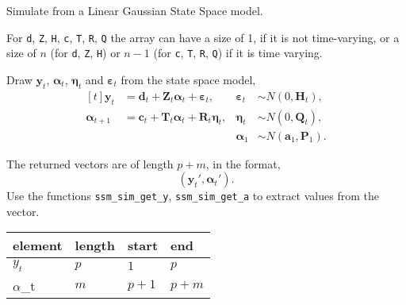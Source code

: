 \documentclass[]{book}
\newcommand{\mat}[1]{\boldsymbol{#1}}
\renewcommand{\vec}[1]{\boldsymbol{#1}}
\begin{document}
Simulate from a Linear Gaussian State Space model.

For \texttt{d}, \texttt{Z}, \texttt{H}, \texttt{c}, \texttt{T},
\texttt{R}, \texttt{Q} the array can have a size of 1, if it is not
time-varying, or a size of \(n\) (for \texttt{d}, \texttt{Z},
\texttt{H}) or \(n - 1\) (for \texttt{c}, \texttt{T}, \texttt{R},
\texttt{Q}) if it is time varying.

Draw \(\vec{y}_t\), \(\vec{\alpha}_t\), \(\vec{\eta}_t\) and
\(\vec{\varepsilon}_t\) from the state space model, \[
\begin{aligned}[t]
\vec{y}_t &= \vec{d}_t + \mat{Z}_t \vec{\alpha}_t + \vec{\varepsilon}_t,  &
\vec{\varepsilon}_t & \sim N(0, \mat{H}_t), \\
\vec{\alpha}_{t + 1} &= \vec{c}_t + \mat{T}_t \vec{\alpha}_t + \mat{R}_t \vec{\eta}_t,  &
\vec{\eta}_t & \sim N(0, \mat{Q}_t), \\
&& \vec{\alpha}_1 &\sim N(\vec{a}_1, \mat{P}_1) .
\end{aligned}
\]

The returned vectors are of length \(p + m\), in the format, \[
(\vec{y}_t', \vec{\alpha}_t') .
\] Use the functions \texttt{ssm\_sim\_get\_y},
\texttt{ssm\_sim\_get\_a} to extract values from the vector.

\begin{longtable}[]{@{}llll@{}}
\toprule
element & length & start & end\tabularnewline
\midrule
\endhead
\(y_t\) & \(p\) & \(1\) & \(p\)\tabularnewline
\(\alpha\)\_t & \(m\) & \(p + 1\) & \(p + m\)\tabularnewline
\bottomrule
\end{longtable}
\end{document}
